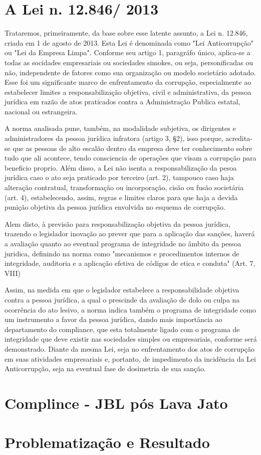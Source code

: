 \chapter{A Lei n. 12.846/ 2013}

Trataremos, primeiramente, da base sobre esse latente assunto, a Lei n. 12.846, criada em 1 de agosto de 2013. Esta Lei é denominada como "Lei Anticorrupção" ou "Lei da Empresa Limpa". Conforme seu artigo 1, paragráfo único, aplica-se a todas as socidades empresariais ou sociedades simokes, ou seja, personificadas ou não, independente de fatores como sua organização ou modelo societário adotado. Esse foi um significante marco de enfrentamento da corrupção, especialmente ao estabelecer limites a responsabilização objetiva, civil e administrativa, da pessoa jurídica em razão de atos praticados contra a Administração Publica estatal, nacional ou estrangeira. 

A norma analisada pune, também, na modalidade subjetiva, os dirigentes e administradores da pessoa jurídica infratora (artigo 3, §2), isso porque, acredita-se que as pessoas de alto escalão dentro da empresa deve ter conhecimento sobre tudo que ali acontece, tendo consciencia de operações que visam a corrupção para beneficio proprio. Além disso, a Lei não isenta a responsabilização da pesoa jurídica caso o ato seja praticado por terceiro (art. 2), tampouco caso haja alteração contratual, transformação ou incorporação, cisão ou fusão societária (art. 4), estabelecendo, assim, regras e limites claros para que haja a devida punição objetiva da pessoa jurídica envolvida no esquema de corrupção. 

Alem disto, à previsão para responsabilização objetiva da pessoa jurídica, trazendo o legislador inovação ao prever que para a aplicação das sanções, haverá a avaliação quanto ao eventual programa de integridade no âmbito da pessoa juridica, definindo na norma como "mecanismos e procedimentos internos de integridade, auditoria e a aplicação efetiva de códigos de etica e conduta" (Art. 7, VIII)

Assim, na medida em que o legislador estabelece a responsabilidade objetiva contra a pessoa jurídica, a qual o prescinde da avaliação de dolo ou culpa na ocorrência do ato lesivo, a norma indica também o programa de integridade como um instrumento a favor da pessoa jurídica, dando mais importância ao departamento do compliance, que esta totalmente ligado com o programa de integridade que deve existir nas sociedades simples ou empresariais, conforme será demonstrado. Diante da mesma Lei, seja no enfrentamento dos atos de corrupção em suas atividades empresariais e, portanto, de impedimento da incidência da Lei Anticorrupção, seja na eventual fase de dosimetria de sua sanção. 



\chapter{Complince - JBL pós Lava Jato }



\chapter{Problematização e Resultado}



